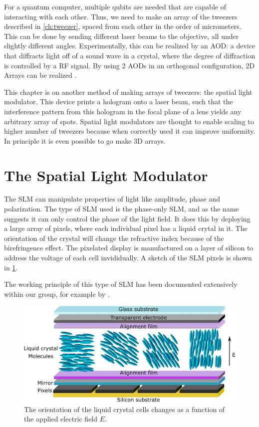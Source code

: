 For a quantum computer, multiple qubits are needed that are capable of interacting with each other. Thus, we need to make an array of the tweezers described in \cref{ch:tweezer}, spaced from each other in the order of micrometers. This can be done by sending different laser beams to the objective, all under slightly different angles. Experimentally, this can be realized by an \ac{AOD}: a device that diffracts light off of a sound wave in a crystal, where the degree of diffraction is controlled by a RF signal. By using 2 AODs in an orthogonal configuration, 2D Arrays can be realized \cite{Manuel2016}.

This chapter is on another method of making arrays of tweezers: the spatial light modulator. This device prints a hologram onto a laser beam, such that the interference pattern from this hologram in the focal plane of a lens yields any arbitrary array of spots. Spatial light modulators are thought to enable scaling to higher number of tweezers because when correctly used it can improve uniformity. In principle it is even possible to go make 3D arrays. 

\section{The Spatial Light Modulator}

The \ac{SLM} can manipulate properties of light like amplitude, phase and polarization. The type of SLM used is the phase-only SLM, and as the name suggests it can only control the phase of the light field. It does this by deploying a large array of pixels, where each individual pixel has a liquid crytal in it. The orientation of the crystal will change the refractive index because of the birefringence effect. The pixelated display is manufactured on a layer of silicon to address the voltage of each cell invididually. A sketch of the SLM pixels is shown in \cref{fig:LCoS}.

The working principle of this type of SLM has been documented extensively within our group, for example by \cite{Dijk2012,Bijnen2013,Bijnen2015}. 

\begin{figure}
    \centering
    \includegraphics[width=0.6\linewidth]{figures/LCoS.png}
    \caption{The orientation of the liquid crystal cells changes as a function of the applied electric field $E$.}
    \label{fig:LCoS}
\end{figure}

